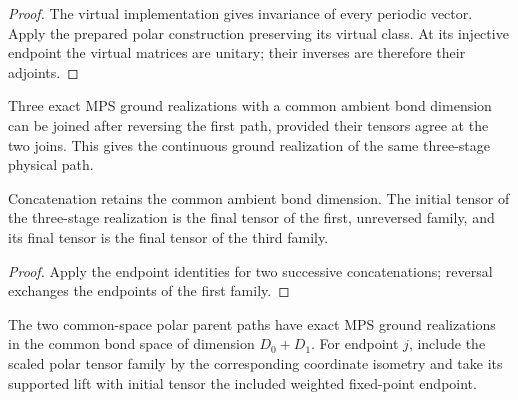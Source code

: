 \begin{proof}\leanok
    The virtual implementation gives invariance of every periodic
    vector. Apply the prepared polar construction preserving its virtual
    class. At its injective endpoint the virtual matrices are unitary;
    their inverses are therefore their adjoints.
\end{proof}

\begin{definition}
    \label{def:spt_exact_ground_reverse_three_stage}
    \leanok
    Three exact MPS ground realizations with a common ambient bond
    dimension can be joined after reversing the first path, provided
    their tensors agree at the two joins. This gives the continuous
    ground realization of the same three-stage physical path.
\end{definition}

\begin{lemma}
    \label{thm:spt_exact_ground_three_stage_endpoints}
    \leanok
    Concatenation retains the common ambient bond dimension. The initial
    tensor of the three-stage realization is the final tensor of the
    first, unreversed family, and its final tensor is the final tensor
    of the third family.
\end{lemma}

\begin{proof}\leanok
    Apply the endpoint identities for two successive concatenations;
    reversal exchanges the endpoints of the first family.
\end{proof}

\begin{definition}
    \label{def:spt_common_physical_polar_ground_paths}
    \leanok
    The two common-space polar parent paths have exact MPS ground
    realizations in the common bond space of dimension $D_0+D_1$.
    For endpoint $j$, include the scaled polar tensor family by the
    corresponding coordinate isometry and take its supported lift
    with initial tensor the included weighted fixed-point endpoint.
\end{definition}

